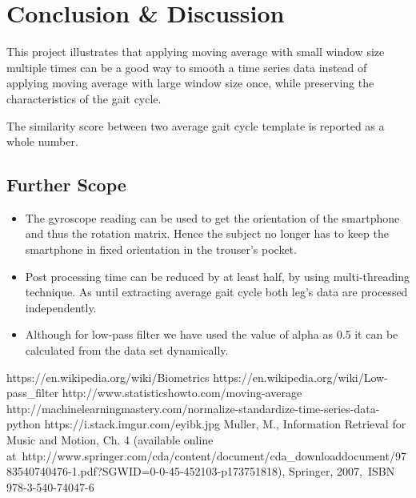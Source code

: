 \documentclass[a4paper]{report}
\begin{document}
\newpage
\chapter{Conclusion \& Discussion}


This project illustrates that applying moving average with small window size multiple times can be a good way to smooth a time series data instead of applying moving average with large window size once, while preserving the characteristics of the gait cycle.

The similarity score between two average gait cycle template is reported as a whole number.

\section*{Further Scope}
\begin{itemize}
\item The gyroscope reading can be used to get the orientation of the smartphone and thus the rotation matrix. Hence the subject no longer has to keep the smartphone in fixed orientation in the trouser’s pocket.
\item Post processing time can be reduced by at least half, by using multi-threading technique. As until extracting average gait cycle both leg’s data are processed independently.
\item Although for low-pass filter we have used the value of alpha as 0.5 it can be calculated from the data set dynamically.
\end{itemize}

\begin{thebibliography}{20}
https://en.wikipedia.org/wiki/Biometrics
https://en.wikipedia.org/wiki/Low-pass\_filter
http://www.statisticshowto.com/moving-average
http://machinelearningmastery.com/normalize-standardize-time-series-data-python
https://i.stack.imgur.com/eyibk.jpg
Muller, M., Information Retrieval for Music and Motion, Ch. 4 (available online at http://www.springer.com/cda/content/document/cda\_downloaddocument/9783540740476-1.pdf?SGWID=0-0-45-452103-p173751818), Springer, 2007, ISBN 978-3-540-74047-6

\end{thebibliography}
\end{document}
